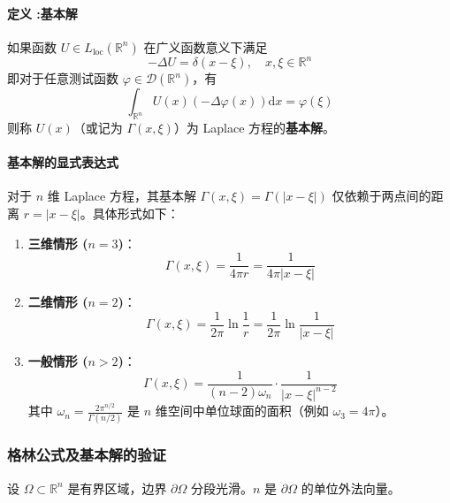 \documentclass[12pt,a4paper]{ctexart}
\begin{document}
	\paragraph{定义 :基本解}
	如果函数 $U \in L_{\text{loc}}(\mathbb{R}^n)$ 在广义函数意义下满足
	\begin{equation}
		-\Delta U = \delta(x-\xi), \quad x, \xi \in \mathbb{R}^n
	\end{equation}
	即对于任意测试函数 $\varphi \in \mathscr{D}(\mathbb{R}^n)$，有
	\[
	\int_{\mathbb{R}^n} U(x) (-\Delta \varphi(x)) \mathrm{d}x = \varphi(\xi)
	\]
	则称 $U(x)$（或记为 $\Gamma(x, \xi)$）为 Laplace 方程的\textbf{基本解}。
	
	\paragraph{基本解的显式表达式}
	对于 $n$ 维 Laplace 方程，其基本解 $\Gamma(x, \xi) = \Gamma(|x-\xi|)$ 仅依赖于两点间的距离 $r = |x-\xi|$。具体形式如下：
	
	\begin{enumerate}
		\item \textbf{三维情形 ($n=3$)}：
		\begin{equation}
			\Gamma(x, \xi) = \frac{1}{4\pi r} = \frac{1}{4\pi |x-\xi|}
		\end{equation}
		
		\item \textbf{二维情形 ($n=2$)}：
		\begin{equation}
			\Gamma(x, \xi) = \frac{1}{2\pi} \ln \frac{1}{r} = \frac{1}{2\pi} \ln \frac{1}{|x-\xi|}
		\end{equation}
		
		\item \textbf{一般情形 ($n > 2$)}：
		\begin{equation}
			\Gamma(x, \xi) = \frac{1}{(n-2)\omega_n} \cdot \frac{1}{|x-\xi|^{n-2}}
		\end{equation}
		其中 $\omega_n = \frac{2\pi^{n/2}}{\Gamma(n/2)}$ 是 $n$ 维空间中单位球面的面积（例如 $\omega_3 = 4\pi$）。
	\end{enumerate}
	
	\subsubsection{格林公式及基本解的验证}
	
	设 $\Omega \subset \mathbb{R}^n$ 是有界区域，边界 $\partial \Omega$ 分段光滑。$n$ 是 $\partial \Omega$ 的单位外法向量。
	
\end{document}
